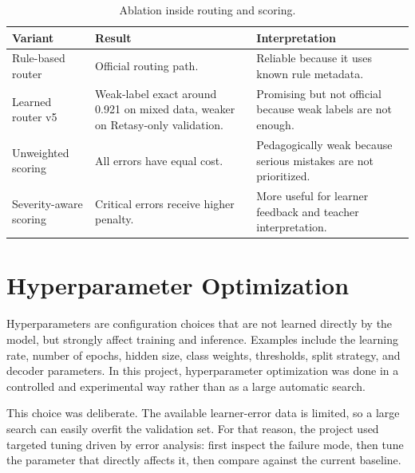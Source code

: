 \documentclass[12pt,a4paper]{report}
\begin{document}
\begin{table}[H]
\centering
\small
\begin{tabularx}{\textwidth}{p{} p{} X}
\toprule
\textbf{Variant} & \textbf{Result} & \textbf{Interpretation} \\
\midrule
Rule-based router &
Official routing path. &
Reliable because it uses known rule metadata. \\
\midrule
Learned router v5 &
Weak-label exact around 0.921 on mixed data, weaker on Retasy-only validation. &
Promising but not official because weak labels are not enough. \\
\midrule
Unweighted scoring &
All errors have equal cost. &
Pedagogically weak because serious mistakes are not prioritized. \\
\midrule
Severity-aware scoring &
Critical errors receive higher penalty. &
More useful for learner feedback and teacher interpretation. \\
\bottomrule
\end{tabularx}
\caption{Ablation inside routing and scoring.}
\label{tab:routing_scoring_ablation}
\end{table}

\section{Hyperparameter Optimization}

Hyperparameters are configuration choices that are not learned directly by the
model, but strongly affect training and inference. Examples include the learning
rate, number of epochs, hidden size, class weights, thresholds, split strategy,
and decoder parameters. In this project, hyperparameter optimization was done in
a controlled and experimental way rather than as a large automatic search.

This choice was deliberate. The available learner-error data is limited, so a
large search can easily overfit the validation set. For that reason, the project
used targeted tuning driven by error analysis: first inspect the failure mode,
then tune the parameter that directly affects it, then compare against the
current baseline.
\end{document}

